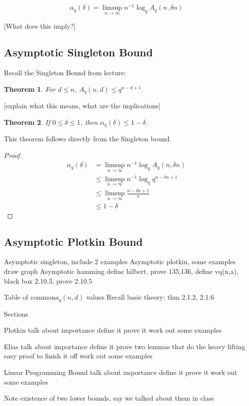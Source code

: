 \documentclass{article}
\newtheorem{theorem}{Theorem}
\numberwithin{theorem}{subsection}
\begin{document}
\begin{equation}
\alpha_{q}(\delta) = \limsup_{n \to \infty} n^{-1} \log_q A_q(n,\delta n)
\end{equation}


[What does this imply?]

\subsection{Asymptotic Singleton Bound}

Recall the Singleton Bound from lecture:

\begin{theorem}
For $d \le n$, $A_q(n,d) \le q^{n-d+1}$.
\end{theorem}

[explain what this means, what are the implications]


\begin{theorem}
If $0 \le \delta \le 1$, then $\alpha_q(\delta) \le 1 - \delta$.
\end{theorem} 
This theorem follows directly from the Singleton bound.

\begin{proof}
\begin{equation} 
\begin{split}
\alpha_{q}(\delta) & = \limsup_{n \to \infty} n^{-1} \log_q A_q(n,\delta n) \\
& \le \limsup_{n \to \infty} n^{-1} \log_q q^{n-\delta n+1} \\
& \le \limsup_{n \to \infty} \frac{n-\delta n+1}{n} \\
& \le 1 - \delta
\end{split}
\end{equation}
\end{proof}

\subsection{Asymptotic Plotkin Bound}



Asymptotic singleton, include 2 examples
Asymptotic plotkin, some examples
draw graph
Asymptotic hamming
	define hilbert, prove 135,136, define vq(n,a),
	black box 2.10.3, prove 2.10.5


Table of common$a_q(n,d)$ values
Recall basic theory: thm 2.1.2, 2.1.6

Sections
 
Plotkin
talk about importance
define it
prove it
work out some examples

Elias
talk about importance
define it
prove two lemmas that do the heavy lifting
easy proof to finish it off
work out some examples

Linear Programming Bound
talk about importance
define it
prove it
work out some examples


Note existence of two lower bounds, say we talked about them in class
\end{document}

